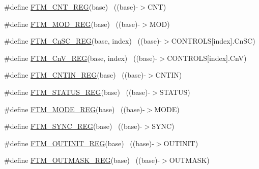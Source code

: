 \begin{DoxyCompactItemize}
\item 
\#define \hyperlink{group___f_t_m___register___accessor___macros_ga1ba1654f76ecc24de48047117cb5b45e}{F\+T\+M\+\_\+\+C\+N\+T\+\_\+\+R\+EG}(base)                                            ~((base)-\/$>$C\+NT)
\item 
\#define \hyperlink{group___f_t_m___register___accessor___macros_gabbea5752afc54317fcb50890f8593a49}{F\+T\+M\+\_\+\+M\+O\+D\+\_\+\+R\+EG}(base)                                            ~((base)-\/$>$M\+OD)
\item 
\#define \hyperlink{group___f_t_m___register___accessor___macros_ga49332bccc11dd36d399f3fff66f313b5}{F\+T\+M\+\_\+\+Cn\+S\+C\+\_\+\+R\+EG}(base,  index)                              ~((base)-\/$>$C\+O\+N\+T\+R\+O\+LS\mbox{[}index\mbox{]}.Cn\+SC)
\item 
\#define \hyperlink{group___f_t_m___register___accessor___macros_gaacf8fed24da463653900319184874197}{F\+T\+M\+\_\+\+Cn\+V\+\_\+\+R\+EG}(base,  index)                                ~((base)-\/$>$C\+O\+N\+T\+R\+O\+LS\mbox{[}index\mbox{]}.CnV)
\item 
\#define \hyperlink{group___f_t_m___register___accessor___macros_ga2bac47a7c51c2e7f81edba5a00f949f2}{F\+T\+M\+\_\+\+C\+N\+T\+I\+N\+\_\+\+R\+EG}(base)                                        ~((base)-\/$>$C\+N\+T\+IN)
\item 
\#define \hyperlink{group___f_t_m___register___accessor___macros_gae9cc2c8dd99da090bcbe0039637f4b0d}{F\+T\+M\+\_\+\+S\+T\+A\+T\+U\+S\+\_\+\+R\+EG}(base)                                      ~((base)-\/$>$S\+T\+A\+T\+US)
\item 
\#define \hyperlink{group___f_t_m___register___accessor___macros_ga2b015e87a081f48499ab1becb9c003c9}{F\+T\+M\+\_\+\+M\+O\+D\+E\+\_\+\+R\+EG}(base)                                          ~((base)-\/$>$M\+O\+DE)
\item 
\#define \hyperlink{group___f_t_m___register___accessor___macros_ga749433fea6be26b0ca61150ab722dca0}{F\+T\+M\+\_\+\+S\+Y\+N\+C\+\_\+\+R\+EG}(base)                                          ~((base)-\/$>$S\+Y\+NC)
\item 
\#define \hyperlink{group___f_t_m___register___accessor___macros_ga689e5e15a9b7e64bb944251aeebafddc}{F\+T\+M\+\_\+\+O\+U\+T\+I\+N\+I\+T\+\_\+\+R\+EG}(base)                                    ~((base)-\/$>$O\+U\+T\+I\+N\+IT)
\item 
\#define \hyperlink{group___f_t_m___register___accessor___macros_gaed9953404dbe94ee34e8a906489506c2}{F\+T\+M\+\_\+\+O\+U\+T\+M\+A\+S\+K\+\_\+\+R\+EG}(base)                                    ~((base)-\/$>$O\+U\+T\+M\+A\+SK)

\end{DoxyCompactItemize}
